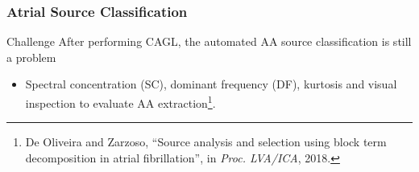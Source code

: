 \documentclass{beamer}
\begin{document}
	\begin{frame}
		\frametitle{Atrial Source Classification}
			
			\begin{block}{Challenge}
				After performing CAGL, the automated AA source classification is still a problem
			\end{block}
			
			\begin{itemize}
				\item Spectral concentration (SC), dominant frequency (DF), kurtosis and visual inspection to evaluate AA extraction\footnote{De Oliveira and Zarzoso, ``Source analysis and selection using block term decomposition in atrial fibrillation'', in \textit{Proc. LVA/ICA}, 2018.}.
			\end{itemize}
	\end{frame}	
\end{document}

